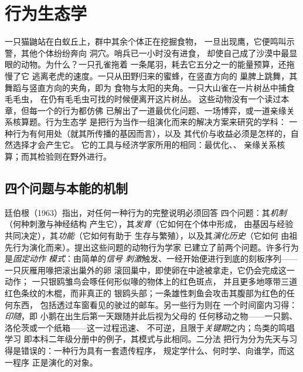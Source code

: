 \chapter{行为生态学}\label{ch:b3:behavioural-ecology}

一只猫鼬站在白蚁丘上，群中其余个体正在挖掘食物，
一旦出现鹰，它便鸣叫示警，其他个体纷纷奔向
洞穴。哨兵已一小时没有进食，
却使自己成了沙漠中最显眼的动物。为什么？一只孔雀拖着
一条尾羽，耗去它五分之一的能量预算，还拖慢了它
逃离老虎的速度。一只从田野归来的蜜蜂，在竖直方向的
巢脾上跳舞，其舞蹈与竖直方向的夹角，即为
食物与太阳的夹角。一只大山雀在一片树丛中捕食毛毛虫，
在仍有毛毛虫可找的时候便离开这片树丛。
这些动物没有一个读过本章，但每一个的行为都仿佛
已解出了一道最优化问题、一场博弈，或一道亲缘关系核算题。行为生态学
是把行为当作一组演化而来的解决方案来研究的学科：
一种行为有何用处（就其所传播的基因而言），以及
其代价与收益必须是怎样的，自然选择才会产生它。
它的工具与经济学家所用的相同：最优化、、
亲缘关系核算；而其检验则在野外进行。

\section{四个问题与本能的机制}

\begin{definition}[廷伯根的四个问题]\label{def:b3:behavioural-ecology:tinbergen}
廷伯根（1963）指出，对任何一种行为的完整说明必须回答
四个问题：其\emph{机制}（何种刺激与神经结构
产生它），其\emph{发育}（它如何在个体中形成，
由基因与经验共同决定），其\emph{功能}（它如何有助于
生存与繁殖），以及其\emph{演化历史}（它如何
由祖先行为演化而来）。提出这些问题的动物行为学家
已建立了前两个问题。许多行为是\emph{固定动作
模式}：由简单的\emph{信号
刺激}触发、一经开始便进行到底的刻板序列——一只灰雁用喙把滚出巢外的卵
滚回巢中，即使卵在中途被拿走，它仍会完成这一动作；
一只银鸥雏鸟会啄任何形似喙的物体上的红色斑点，
并且更多地啄带三道红色条纹的木棍，而非真正的
银鸥头部；一条雄性刺鱼会攻击其腹部为红色的任何东西，
包括透过车窗看见的驶过的邮车。另一些行为则在
一个时间窗内习得：\emph{印随}，即
小鹅在出生后第一天跟随并此后视为父母的
任何移动之物——一只鹅、洛伦茨或一个纸箱——这一过程迅速、
不可逆，且限于\emph{关键期}之内；鸟类的鸣唱学习
即本科二年级分册中的例子，其模式与此相同。二分法
把行为分为先天与习得是错误的：一种行为具有一套遗传程序，
规定学什么、何时学、向谁学，而这一程序
正是演化的对象。
\end{definition}

